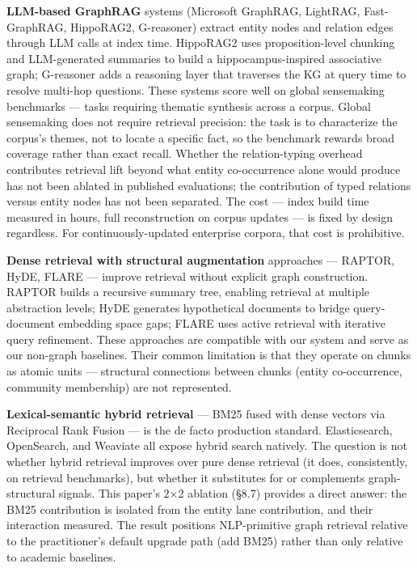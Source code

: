 \documentclass[
]{article}
\begin{document}
\textbf{LLM-based GraphRAG} systems (Microsoft GraphRAG, LightRAG,
Fast-GraphRAG, HippoRAG2, G-reasoner) extract entity nodes and relation
edges through LLM calls at index time. HippoRAG2 uses proposition-level
chunking and LLM-generated summaries to build a hippocampus-inspired
associative graph; G-reasoner adds a reasoning layer that traverses the
KG at query time to resolve multi-hop questions. These systems score
well on global sensemaking benchmarks --- tasks requiring thematic
synthesis across a corpus. Global sensemaking does not require retrieval
precision: the task is to characterize the corpus's themes, not to
locate a specific fact, so the benchmark rewards broad coverage rather
than exact recall. Whether the relation-typing overhead contributes
retrieval lift beyond what entity co-occurrence alone would produce has
not been ablated in published evaluations; the contribution of typed
relations versus entity nodes has not been separated. The cost --- index
build time measured in hours, full reconstruction on corpus updates ---
is fixed by design regardless. For continuously-updated enterprise
corpora, that cost is prohibitive.

\textbf{Dense retrieval with structural augmentation} approaches ---
RAPTOR, HyDE, FLARE --- improve retrieval without explicit graph
construction. RAPTOR builds a recursive summary tree, enabling retrieval
at multiple abstraction levels; HyDE generates hypothetical documents to
bridge query-document embedding space gaps; FLARE uses active retrieval
with iterative query refinement. These approaches are compatible with
our system and serve as our non-graph baselines. Their common limitation
is that they operate on chunks as atomic units --- structural
connections between chunks (entity co-occurrence, community membership)
are not represented.

\textbf{Lexical-semantic hybrid retrieval} --- BM25 fused with dense
vectors via Reciprocal Rank Fusion --- is the de facto production
standard. Elasticsearch, OpenSearch, and Weaviate all expose hybrid
search natively. The question is not whether hybrid retrieval improves
over pure dense retrieval (it does, consistently, on retrieval
benchmarks), but whether it substitutes for or complements
graph-structural signals. This paper's 2×2 ablation (§8.7) provides a
direct answer: the BM25 contribution is isolated from the entity lane
contribution, and their interaction measured. The result positions
NLP-primitive graph retrieval relative to the practitioner's default
upgrade path (add BM25) rather than only relative to academic baselines.
\end{document}
